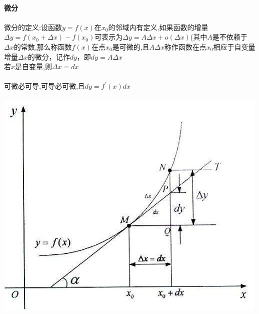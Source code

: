 \documentclass{article}
\begin{document}
\begin{flushleft}
	~\\ \textbf{微分}\\~\\
	
	微分的定义:设函数$y=f(x)$在$x_0$的邻域内有定义,如果函数的增量$\Delta y = f(x_0 + \Delta x) − f(x_0)$可表示为$ \Delta y = A\Delta x + o(\Delta x)$(其中$A$是不依赖于$\Delta x$的常数,那么称函数$f(x)$在点$x_0$是可微的,且$A\Delta x$称作函数在点$x_0$相应于自变量增量$\Delta x$的微分，记作$dy$，即$dy = A\Delta x$\\
	若$x$是自变量,则$\Delta x=dx$\\
	~\\
	可微必可导,可导必可微,且$dy=f^{'}(x)dx$\\
	~\\
	\includegraphics[scale=1.0]{1.jpg}
	
\end{flushleft}
\end{document}

